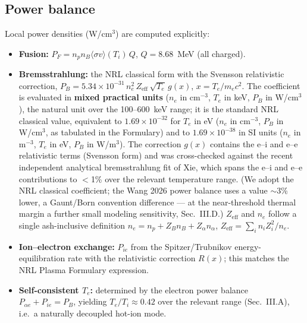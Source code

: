 \documentclass[aip,pop,reprint,amsmath,amssymb,floatfix]{revtex4-2}
\begin{document}
\subsection{Power balance}

Local power densities (W/cm$^3$) are computed explicitly:
\begin{itemize}
\item \textbf{Fusion:} $P_F = n_p n_B \langle\sigma v\rangle(T_i)\,Q$, $Q = 8.68$~MeV (all charged).
\item \textbf{Bremsstrahlung:} the NRL classical form with the Svensson relativistic correction, $P_B = 5.34\times10^{-31}\,n_e^2\,Z_\mathrm{eff}\,\sqrt{T_e}\,g(x)$, $x = T_e/m_e c^2$. The coefficient is evaluated in \textbf{mixed practical units} ($n_e$ in cm$^{-3}$, $T_e$ in keV, $P_B$ in W/cm$^3$), the natural unit over the 100--600~keV range; it is the standard NRL classical value\cite{nrl}, equivalent to $1.69\times10^{-32}$ for $T_e$ in eV ($n_e$ in cm$^{-3}$, $P_B$ in W/cm$^3$, as tabulated in the Formulary) and to $1.69\times10^{-38}$ in SI units ($n_e$ in m$^{-3}$, $T_e$ in eV, $P_B$ in W/m$^3$). The correction $g(x)$ contains the e--i and e--e relativistic terms (Svensson form) and was cross-checked against the recent independent analytical bremsstrahlung fit of Xie\cite{brems}, which spans the e--i and e--e contributions to $<$1\% over the relevant temperature range. (We adopt the NRL classical coefficient; the Wang 2026 power balance uses a value $\sim$3\% lower, a Gaunt/Born convention difference --- at the near-threshold thermal margin a further small modeling sensitivity, Sec.~III.D.) $Z_\mathrm{eff}$ and $n_e$ follow a single ash-inclusive definition $n_e = n_p + Z_B n_B + Z_\alpha n_\alpha$, $Z_\mathrm{eff} = \sum_i n_i Z_i^2 / n_e$.
\item \textbf{Ion--electron exchange:} $P_{ie}$ from the Spitzer/Trubnikov energy-equilibration rate with the relativistic correction $R(x)$; this matches the NRL Plasma Formulary expression.
\item \textbf{Self-consistent $T_e$:} determined by the electron power balance $P_{\alpha e} + P_{ie} = P_B$, yielding $T_e/T_i \approx 0.42$ over the relevant range (Sec.~III.A), i.e.\ a naturally decoupled hot-ion mode.\cite{noteLnL}

\end{itemize}
\end{document}
